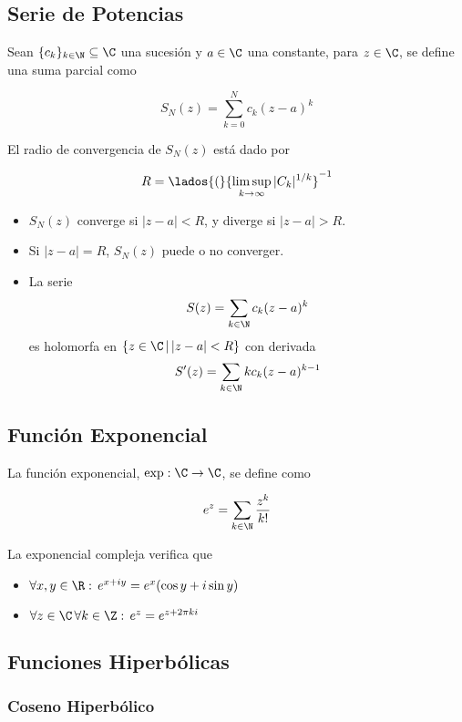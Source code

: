\subsection{Serie de Potencias}


Sean $\{c_k\}_{k\in\N}\subseteq\C$ una sucesión y $a\in\C$ una constante, para $z\in\C$, se define una suma parcial como

\[S_N(z)=\sum^N_{k=0}c_k(z-a)^k\]

El radio de convergencia de $S_N(z)$ está dado por

\[R=\lados{(}{\limsup_{k\to\infty}|C_k|^{1/k}}^{-1}\]

\begin{itemize}
    \item $S_N(z)$ converge si $|z-a|<R$, y diverge si $|z-a|>R$.
    \item Si $|z-a|=R$, $S_N(z)$ puede o no converger.
    \item La serie
    \[S(z) = \sum_{k\in\N}c_k(z-a)^k\]
    es holomorfa en $\{z\in\C\,|\,|z-a|<R\}$ con derivada
    \[S'(z) = \sum_{k\in\N}kc_k(z-a)^{k-1}\]
\end{itemize}

\subsection{Función Exponencial}

La función exponencial, $\exp:\C\to\C$, se define como

\[e^z=\sum_{k\in\N}\frac{z^k}{k!}\]

La exponencial compleja verifica que

\begin{itemize}
    \item $\forall x,y\in\R:\,e^{x+iy}=e^x(\cos{y}+i\sin{y})$
    \item $\forall z\in\C\,\forall k\in\Z:\,e^z=e^{z+2\pi ki}$
\end{itemize}

\subsection{Funciones Hiperbólicas}

\subsubsection{Coseno Hiperbólico}

